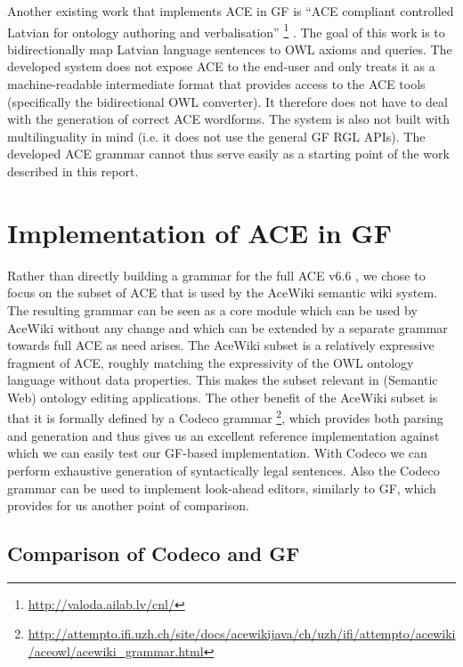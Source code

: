 \documentclass[a4paper]{article}
\begin{document}
Another existing work that implements ACE in GF is
``ACE compliant controlled Latvian for ontology authoring and verbalisation''
\footnote{\url{http://valoda.ailab.lv/cnl/}}
\cite{gruzitis:phd}. The goal of this work is to bidirectionally map Latvian
language sentences to OWL axioms and queries. The developed system
does not expose ACE to the end-user and only treats it as a
machine-readable intermediate format that provides access to the ACE tools
(specifically the bidirectional OWL converter).
It therefore does not have to deal with the
generation of correct ACE wordforms.
The system is also not built with multilinguality in mind
(i.e. it does not use the general GF RGL APIs). The developed ACE grammar
cannot thus serve easily as a starting point of the work described in this
report.


\section{Implementation of ACE in GF}
\label{section:ACE_in_GF}

Rather than directly building a grammar for the
full ACE v6.6 \cite{ACE_6.6_Construction_Rules}, we chose to focus
on the subset of ACE that is used by the AceWiki semantic wiki system. The
resulting grammar can be seen as a core module which can be used by AceWiki
without any change and which can be extended by a separate grammar
towards full ACE as need arises. The AceWiki subset is a relatively expressive
fragment of ACE, roughly matching the expressivity of the OWL ontology
language
\cite{OWL_2_Web_Ontology_Language_Document_Overview}
without data properties.
This makes the subset relevant in (Semantic Web) ontology editing applications.
The other benefit of the AceWiki subset is that it is formally defined by a
Codeco grammar \cite{kuhn:cnl2010_revised}
\footnote{\url{http://attempto.ifi.uzh.ch/site/docs/acewikijava/ch/uzh/ifi/attempto/acewiki/aceowl/acewiki_grammar.html}},
which provides both parsing and generation and thus gives us an excellent
reference implementation against which we can easily test our GF-based
implementation.
With Codeco we can perform exhaustive generation of syntactically legal
sentences. Also the Codeco grammar can be used to implement look-ahead
editors, similarly to GF, which provides for us another point of comparison.

\subsection{Comparison of Codeco and GF}
\label{subsection:Codeco}
\end{document}

